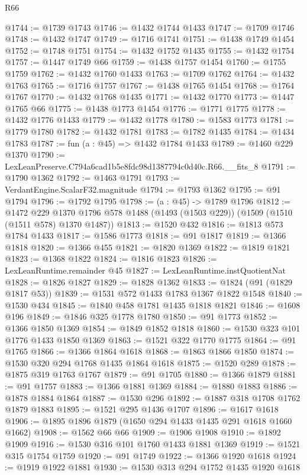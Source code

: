 \begin{lexlean}{R66}
\begin{coremodule}
@1744 := @1739 @1743
@1746 := @1432 @1744 @1433
@1747 := @1709 @1746
@1748 := @1432 @1747
@1749 := @1716 @1741
@1751 := @1438 @1749 @1454
@1752 := @1748 @1751
@1754 := @1432 @1752 @1435
@1755 := @1432 @1754
@1757 := @1447 @1749 @66
@1759 := @1438 @1757 @1454
@1760 := @1755 @1759
@1762 := @1432 @1760 @1433
@1763 := @1709 @1762
@1764 := @1432 @1763
@1765 := @1716 @1757
@1767 := @1438 @1765 @1454
@1768 := @1764 @1767
@1770 := @1432 @1768 @1435
@1771 := @1432 @1770
@1773 := @1447 @1765 @66
@1775 := @1438 @1773 @1454
@1776 := @1771 @1775
@1778 := @1432 @1776 @1433
@1779 := @1432 @1778
@1780 := @1583 @1773
@1781 := @1779 @1780
@1782 := @1432 @1781
@1783 := @1782 @1435
@1784 := @1434 @1783
@1787 := fun (a : @45) => @1432 @1784 @1433
@1789 := @1460 @229 @1370
@1790 := LexLeanPreserve.C794a6cad1b5e8fdc98d1387794c0d40c.R66.__fits_8
@1791 := @1790 @1362
@1792 := @1463 @1791
@1793 := VerdantEngine.ScalarF32.magnitude
@1794 := @1793 @1362
@1795 := @91 @1794
@1796 := @1792 @1795
@1798 := (a : @45) -> @1789 @1796
@1812 := @1472
    @229
    @1370
    @1796
    @578
    @1488
    (@1493 (@1503 @229))
    (@1509 (@1510 (@1511 @578) @1370 @1487))
@1813 := @1520 @432
@1816 := @1813 @573 @1784 @1433
@1817 := @1586 @1773
@1818 := @91 @1817
@1819 := @1366 @1818
@1820 := @1366 @455
@1821 := @1820 @1369
@1822 := @1819 @1821
@1823 := @1368 @1822
@1824 := @1816 @1823
@1826 := LexLeanRuntime.remainder @45
@1827 := LexLeanRuntime.instQuotientNat
@1828 := @1826 @1827
@1829 := @1828 @1362
@1833 := @1824 (@91 (@1829 @1817 @53))
@1839 := @1531 @572 @1433 @1783 @1367 @1822 @1548
@1840 := @1530 @434
@1845 := @1840 @458 @1781 @1435 @1818 @1821
@1846 := @1608 @196
@1849 := @1846 @325 @1778 @1780
@1850 := @91 @1773
@1852 := @1366 @1850 @1369
@1854 := @1849 @1852 @1818
@1860 := @1530 @323 @101 @1776 @1433 @1850 @1369
@1863 := @1521 @322 @1770 @1775
@1864 := @91 @1765
@1866 := @1366 @1864 @1618
@1868 := @1863 @1866 @1850
@1874 := @1530 @320 @294 @1768 @1435 @1864 @1618
@1875 := @1520 @289
@1878 := @1875 @319 @1763 @1767
@1879 := @91 @1705
@1880 := @1366 @1879
@1881 := @91 @1757
@1883 := @1366 @1881 @1369
@1884 := @1880 @1883
@1886 := @1878 @1884 @1864
@1887 := @1530 @296
@1892 := @1887 @318 @1708 @1762 @1879 @1883
@1895 := @1521 @295 @1436 @1707
@1896 := @1617 @1618
@1906 := @1895 @1896 @1879 (@1650 @294 @1433 @1435 @291 @1618 @1660 @1662)
@1908 := @1562 @66 @66
@1909 := @1906 @1908
@1910 := @1892 @1909
@1916 := @1530 @316 @101 @1760 @1433 @1881 @1369
@1919 := @1521 @315 @1754 @1759
@1920 := @91 @1749
@1922 := @1366 @1920 @1618
@1924 := @1919 @1922 @1881
@1930 := @1530 @313 @294 @1752 @1435 @1920 @1618

\end{coremodule}
\end{lexlean}
